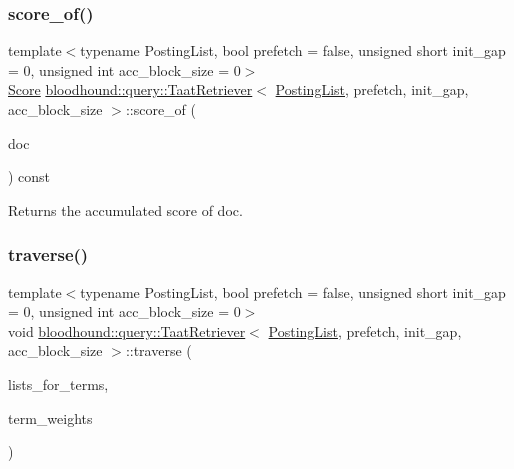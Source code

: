 \mbox{\label{classbloodhound_1_1query_1_1TaatRetriever_ae1c8d9643ca85ba7dba32325538e30b5}} 
\subsubsection{\texorpdfstring{score\+\_\+of()}{score\_of()}}
{\footnotesize\ttfamily template$<$typename Posting\+List, bool prefetch = false, unsigned short init\+\_\+gap = 0, unsigned int acc\+\_\+block\+\_\+size = 0$>$ \\
\mbox{\hyperlink{structbloodhound_1_1Score}{Score}} \mbox{\hyperlink{classbloodhound_1_1query_1_1TaatRetriever}{bloodhound\+::query\+::\+Taat\+Retriever}}$<$ \mbox{\hyperlink{classbloodhound_1_1PostingList}{Posting\+List}}, prefetch, init\+\_\+gap, acc\+\_\+block\+\_\+size $>$\+::score\+\_\+of (\begin{DoxyParamCaption}\item[{\mbox{\hyperlink{structbloodhound_1_1Doc}{Doc}}}]{doc }\end{DoxyParamCaption}) const\hspace{0.3cm}{\ttfamily [inline]}}



Returns the accumulated score of doc. 

\mbox{\label{classbloodhound_1_1query_1_1TaatRetriever_a1b476e4ada85862cb79a92b6424d2aa2}} 
\subsubsection{\texorpdfstring{traverse()}{traverse()}}
{\footnotesize\ttfamily template$<$typename Posting\+List, bool prefetch = false, unsigned short init\+\_\+gap = 0, unsigned int acc\+\_\+block\+\_\+size = 0$>$ \\
void \mbox{\hyperlink{classbloodhound_1_1query_1_1TaatRetriever}{bloodhound\+::query\+::\+Taat\+Retriever}}$<$ \mbox{\hyperlink{classbloodhound_1_1PostingList}{Posting\+List}}, prefetch, init\+\_\+gap, acc\+\_\+block\+\_\+size $>$\+::traverse (\begin{DoxyParamCaption}\item[{const std\+::vector$<$ \mbox{\hyperlink{classbloodhound_1_1PostingList}{Posting\+List}} $>$ \&}]{lists\+\_\+for\+\_\+terms,  }\item[{const std\+::vector$<$ \mbox{\hyperlink{structbloodhound_1_1Score}{Score}} $>$ \&}]{term\+\_\+weights }\end{DoxyParamCaption})\hspace{0.3cm}{\ttfamily [inline]}}



